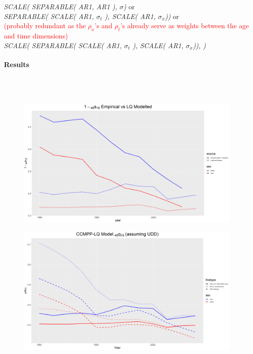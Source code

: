 \documentclass[12pt,a4paper]{article}
\begin{document}
\\~\\
\textit{SCALE( SEPARABLE( AR1, AR1 ), $\sigma$)} or \\
\textit{SEPARABLE( SCALE( AR1, $\sigma_t$ ), SCALE( AR1, $\sigma_x$))} or \\
\textcolor{red}{(probably redundant as the $\rho_x$'s and $\rho_t$'s already serve as weights between the age and time dimensions)} \\
\textit{SCALE( SEPARABLE( SCALE( AR1, $\sigma_t$ ), SCALE( AR1, $\sigma_x$)), \sigma)} 


\newpage
\centering \paragraph{Results} \\~\\
\begin{figure}[H]
\includegraphics[width=\linewidth]{Burkina Faso/2/CCMPP 1-s4515.png}
\end{figure}
\begin{figure}[H]
\includegraphics[width=\linewidth]{Burkina Faso/2/CCMPP q4515 compare WPP and RW.png}
\end{figure}
\end{document}
